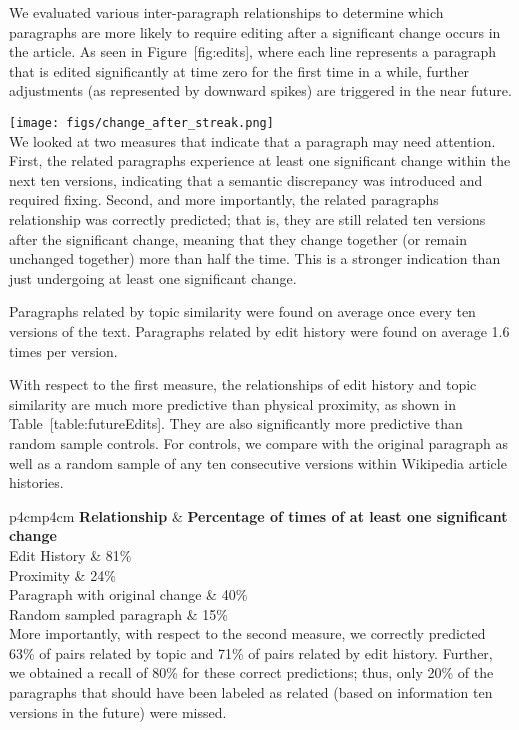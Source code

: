We evaluated various inter-paragraph relationships to determine which
paragraphs are more likely to require editing after a significant change
occurs in the article. As seen in Figure~{[}fig:edits{]}, where each
line represents a paragraph that is edited significantly at time zero
for the first time in a while, further adjustments (as represented by
downward spikes) are triggered in the near future.

\texttt{[image: figs/change\_after\_streak.png]}\\

We looked at two measures that indicate that a paragraph may need
attention. First, the related paragraphs experience at least one
significant change within the next ten versions, indicating that a
semantic discrepancy was introduced and required fixing. Second, and
more importantly, the related paragraphs relationship was correctly
predicted; that is, they are still related ten versions after the
significant change, meaning that they change together (or remain
unchanged together) more than half the time. This is a stronger
indication than just undergoing at least one significant change.

Paragraphs related by topic similarity were found on average once every
ten versions of the text. Paragraphs related by edit history were found
on average 1.6 times per version.

With respect to the first measure, the relationships of edit history and
topic similarity are much more predictive than physical proximity, as
shown in Table~{[}table:futureEdits{]}. They are also significantly more
predictive than random sample controls. For controls, we compare with
the original paragraph as well as a random sample of any ten consecutive
versions within Wikipedia article histories.

{\textbar{}p{4cm}\textbar{}p{4cm}\textbar{}} \textbf{Relationship} \&
\textbf{Percentage of times of at least one significant change}\\Edit
History \& 81\%\\

Proximity \& 24\%\\

Paragraph with original change \& 40\%\\

Random sampled paragraph \& 15\%\\

More importantly, with respect to the second measure, we correctly
predicted 63\% of pairs related by topic and 71\% of pairs related by
edit history. Further, we obtained a recall of 80\% for these correct
predictions; thus, only 20\% of the paragraphs that should have been
labeled as related (based on information ten versions in the future)
were missed.

